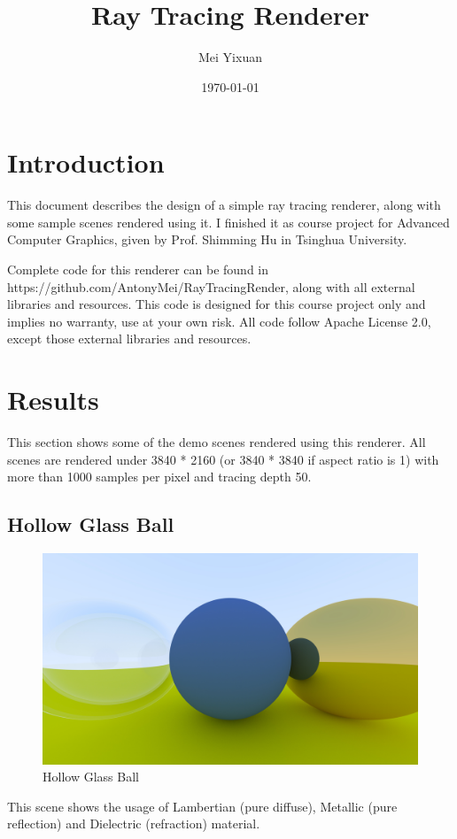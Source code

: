 \documentclass[utf8]{article}
\title{\bf\huge Ray Tracing Renderer}
\author{Mei Yixuan}
\date{\today}
\begin{document}
\maketitle

\section{Introduction}
This document describes the design of a simple ray tracing renderer, along with some sample scenes rendered using it. I finished it as course project for Advanced Computer Graphics, given by Prof. Shimming Hu in Tsinghua University.

Complete code for this renderer can be found in https://github.com/AntonyMei/RayTracingRender, along with all external libraries and resources. This code is designed for this course project only and implies no warranty, use at your own risk. All code follow Apache License 2.0, except those external libraries and resources.

\section{Results}
This section shows some of the demo scenes rendered using this renderer. All scenes are rendered under 3840 * 2160 (or 3840 * 3840 if aspect ratio is 1) with more than 1000 samples per pixel and tracing depth 50.

\subsection{Hollow Glass Ball}
\begin{figure}[H]
	\centering
	\includegraphics[width=0.7\linewidth]{../_results/hollow_glass_ball}
	\caption{Hollow Glass Ball}
	\label{fig:hollowglassball}
\end{figure}
This scene shows the usage of Lambertian (pure diffuse), Metallic (pure reflection) and Dielectric (refraction) material.
\end{document}
